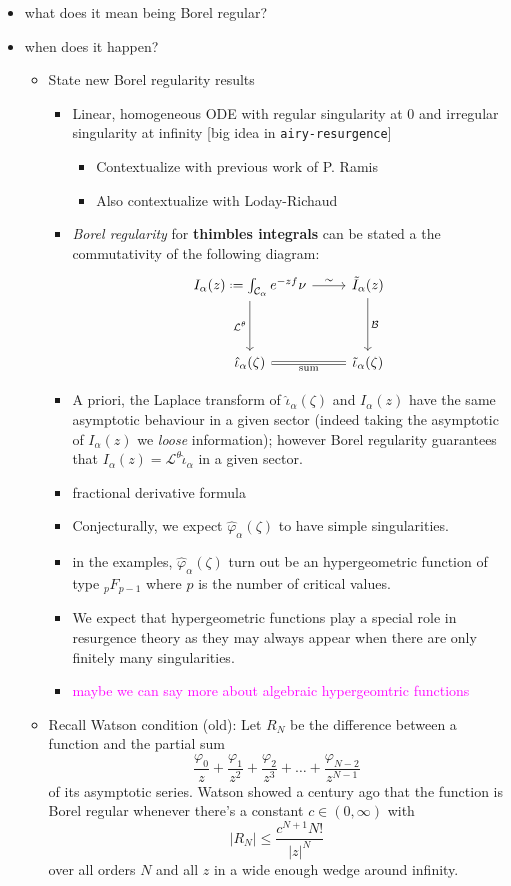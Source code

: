 \documentclass{article}
\newcommand*{\defeq}{\mathrel{\vcenter{\baselineskip0.5ex \lineskiplimit0pt
                     \hbox{\scriptsize.}\hbox{\scriptsize.}}}%
                     =}
\begin{document}
\color{orange}
\begin{itemize}
\item what does it mean being Borel regular?
\item when does it happen?
\begin{itemize}
\item State new Borel regularity results
\begin{itemize}
\item Linear, homogeneous ODE with regular singularity at 0 and irregular singularity at infinity [big idea in {\tt airy-resurgence}]
\begin{itemize}
\item Contextualize with previous work of P. Ramis
\item Also contextualize with Loday-Richaud
\end{itemize}
\item \emph{Borel regularity} for \textbf{thimbles integrals} can be stated a the commutativity of the following diagram:
\begin{equation}
\begin{tikzcd}
I_{\alpha}(z)\defeq\int_{\mathcal{C}_\alpha}e^{-zf}\nu \arrow[r,"\sim"]\arrow[dd, swap, "\mathcal{L}^\theta "] & \tilde{I}_{\alpha}(z)\arrow[dd,"\mathcal{B}"]\\
& \\
\hat{\iota}_\alpha(\zeta)\arrow[r,equal,swap, "\text{sum}"] & \tilde{\iota}_{\alpha}(\zeta) 
\end{tikzcd}
\end{equation}
\item A priori, the Laplace transform of $\hat{\iota}_\alpha(\zeta)$ and $I_{\alpha}(z)$ have the same asymptotic behaviour in a given sector (indeed taking the asymptotic of $I_\alpha(z)$ we \textit{loose} information); however Borel regularity guarantees that $I_{\alpha}(z)=\mathcal{L}^{\theta}\hat{\iota}_{\alpha}$ in a given sector.
\item fractional derivative formula
\item Conjecturally, we expect $\hat{\varphi}_\alpha(\zeta)$ to have simple singularities. 
\item in the examples, $\hat{\varphi}_\alpha(\zeta)$ turn out be an hypergeometric function of type ${}_pF_{p-1}$ where $p$ is the number of critical values. 
\item We expect that hypergeometric functions play a special role in resurgence theory as they may always appear when there are only finitely many singularities.
\item \textcolor{magenta}{maybe we can say more about algebraic hypergeomtric functions}
\end{itemize}
\item Recall Watson condition (old): Let $R_N$ be the difference between a function and the partial sum
\[ \frac{\varphi_0}{z} + \frac{\varphi_1}{z^2} + \frac{\varphi_2}{z^3} + \ldots + \frac{\varphi_{N-2}}{z^{N-1}} \]
of its asymptotic series. Watson showed a century ago that the function is Borel regular whenever there's a constant $c \in (0, \infty)$ with
\[ |R_N| \le \frac{c^{N+1} N!}{|z|^N} \]
over all orders $N$ and all $z$ in a wide enough wedge around infinity.
\end{itemize}
\end{itemize}
\end{document}
